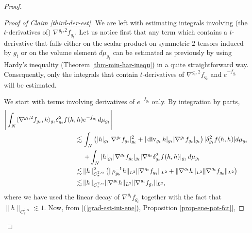 \documentclass[a4paper,11pt,reqno]{amsart}
\def\div{\mathop{\rm div}\nolimits}
\def\div{\mathop{\rm div}\nolimits}
\numberwithin{equation}{section}
\begin{document}
\begin{proof}
\begin{proof}[Proof of Claim \ref{third-der-est}]
			We are left with estimating integrals involving (the $t$-derivatives of) $\nabla^{g_t,2}f_{g_t}$. Let us notice first that any term which contains a $t$-derivative that falls either on the scalar product on symmetric $2$-tensors induced by $g_t$ or on the volume element $d\mu_{g_t}$ can be estimated as previously by using Hardy's inequality (Theorem \ref{thm-min-har-inequ}) in a quite straightforward way. Consequently, only the integrals that contain $t$-derivatives of $\nabla^{g_t,2}f_{g_t}$ and $e^{-f_{g_t}}$ will be estimated.
			
			We start with terms involving derivatives of $e^{-f_{g_t}}$ only. By integration by parts,
			\begin{equation*}
			\begin{split}
			\Bigg|\int_N\langle\nabla^{g_t,2}f_{g_t},h\rangle_{g_t}\delta_{g_t}^2f(h,h)&e^{-f_{g_t}}d\mu_{g_t}\Bigg|\\
			\lesssim\,&\int_N\left(|h|_{g_t}|\nabla^{g_t}f_{g_t}|^2_{g_t}+|\div_{g_t}h|_{g_t}|\nabla^{g_t}f_{g_t}|_{g_t}\right)|\delta_{g_t}^2f(h,h)|d\mu_{g_t}\\
			&+\int_N|h|_{g_t}|\nabla^{g_t}f_{g_t}|_{g_t}|\nabla^{g_t}\delta_{g_t}^2f(h,h)|_{g_t}\,d\mu_{g_t}\\
			\lesssim\,&\|h\|^2_{C^{2,\alpha}_{\tau}}\left(\|\rho_{g_b}^{-1}h\|_{L^2}\|\nabla^{g_t}f_{g_t}\|_{L^2}+\|\nabla^{g_t}h\|_{L^2}\|\nabla^{g_t}f_{g_t}\|_{L^2}\right)\\
			\lesssim\,&\|h\|_{C^{2,\alpha}_{\tau}}\|\nabla^{g_t}h\|_{L^2}\|\nabla^{g_t}f_{g_t}\|_{L^2},
			\end{split}
			\end{equation*}
			where we have used the linear decay of $\nabla^{g_t}f_{g_t}$ together with the fact that $\|h\|_{C^{2,\alpha}_{\tau}}\lesssim 1$. Now, from [(\ref{grad-est-int-ene}), Proposition \ref{prop-ene-pot-fct}],
			

\end{proof}
\end{proof}
\end{document}
